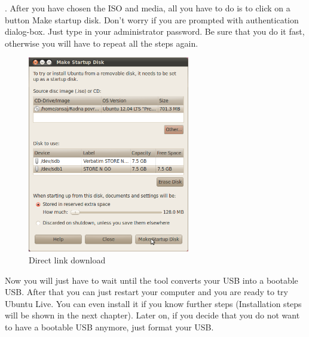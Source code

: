 \par {}. After you have chosen the ISO and media, all you have to do is to click on a button  Make startup disk. Don't worry if you are prompted with authentication dialog-box. Just type in your administrator password. Be sure that you do it fast, otherwise you will have to repeat all the steps again. \\

\begin{figure}[h!]	
	\begin{center}
	\includegraphics[width=200pt]{./images/obtain-ubuntu/USB6.png}
	\caption{Direct link download}	
	\label{fig:usb6}	
	\end{center}
\end{figure}

\par \noindent Now you will just have to wait until the tool converts your USB into a bootable USB.  After that you can just restart your computer and you are ready to try Ubuntu Live. You can even install it if you know further steps (Installation steps will be shown in the next chapter). Later on, if you decide that  you do not want to have a bootable USB anymore, just format your USB. 